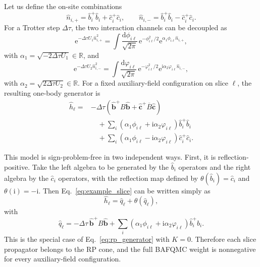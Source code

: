 \documentclass[twocolumn,aps,prb,10pt,amsmath,amssymb,amsthm,superscriptaddress]{revtex4-2}
\newcommand{\dd}{\mathrm{d}}
\newcommand{\ee}{\mathrm{e}}
\newcommand{\ii}{\mathrm{i}}
\newcommand{\bb}[1]{\bm{#1}}
\theoremstyle{remark}
\begin{document}
Let us define the on-site combinations
\begin{equation}
    \hat n_{i,+}=\hat b_i^+\hat b_i+\hat c_i^+\hat c_i,
    \qquad
    \hat n_{i,-}=\hat b_i^+\hat b_i-\hat c_i^+\hat c_i.
\end{equation}
For a Trotter step $\Delta\tau$, the two interaction channels can be decoupled as
\begin{equation}
    \ee^{-\Delta\tau U_1 \hat n_{i,+}^2}
    = \int \frac{\dd\phi_{i\ell}}{\sqrt{2\pi}}\,
      \ee^{-\phi_{i\ell}^2/2}
      \ee^{\alpha_1\phi_{i\ell}\hat n_{i,+}},
\end{equation}
with $\alpha_1=\sqrt{-2\Delta\tau U_1}\in\mathbb R$, and
\begin{equation}
    \ee^{-\Delta\tau U_2 \hat n_{i,-}^2}
    = \int \frac{\dd\varphi_{i\ell}}{\sqrt{2\pi}}\,
      \ee^{-\varphi_{i\ell}^2/2}
      \ee^{\ii\alpha_2\varphi_{i\ell}\hat n_{i,-}},
\end{equation}
with $\alpha_2=\sqrt{2\Delta\tau U_2}\in\mathbb R$. For a fixed auxiliary-field configuration on slice $\ell$, the resulting one-body generator is
\begin{equation}
\begin{aligned}
    \hat h_\ell ={}& -\Delta\tau\left(\hat{\bb b}^+ B\hat{\bb b} + \hat{\bb c}^+\overline{B}\hat{\bb c}\right) \\
    &\quad + \sum_i \left(\alpha_1\phi_{i\ell}+\ii\alpha_2\varphi_{i\ell}\right)\hat b_i^+\hat b_i \\
    &\quad + \sum_i \left(\alpha_1\phi_{i\ell}-\ii\alpha_2\varphi_{i\ell}\right)\hat c_i^+\hat c_i.
\end{aligned}
\label{eq:example_slice}
\end{equation}

This model is sign-problem-free in two independent ways. First, it is reflection-positive. Take the left algebra to be generated by the $\hat b_i$ operators and the right algebra by the $\hat c_i$ operators, with the reflection map defined by $\theta(\hat b_i)=\hat c_i$ and $\theta(\ii)=-\ii$. Then Eq.~\eqref{eq:example_slice} can be written simply as
\begin{equation}
    \hat h_\ell = \hat q_\ell + \theta(\hat q_\ell),
\end{equation}
with
\begin{equation}
    \hat q_\ell = -\Delta\tau\,\hat{\bb b}^+ B\hat{\bb b} + \sum_i \left(\alpha_1\phi_{i\ell}+\ii\alpha_2\varphi_{i\ell}\right)\hat b_i^+\hat b_i.
\end{equation}
This is the special case of Eq.~\eqref{eq:rp_generator} with $K=0$. Therefore each slice propagator belongs to the RP cone, and the full BAFQMC weight is nonnegative for every auxiliary-field configuration.
\end{document}
